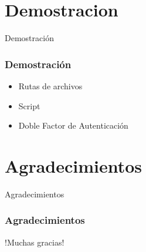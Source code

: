\documentclass{beamer}
\begin{document}
\section{Demostracion}
\begin{frame}{Demostración}
	\frametitle{Demostración}
	\begin{itemize}
		\item Rutas de archivos
		\item Script
		\item Doble Factor de Autenticación
	\end{itemize}
\end{frame}
\section{Agradecimientos}
\begin{frame}{Agradecimientos}
	\frametitle{Agradecimientos}
	\begin{center}
	\huge !Muchas gracias!
	\end{center}
\end{frame}
\end{document}
